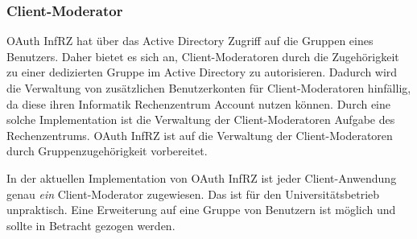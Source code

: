 \documentclass[12pt,a4paper,pointednumbers,abstracton]{scrartcl}
\begin{document}
\subsubsection{Client-Moderator}
\label{sec:oauth-infrz/moderator}

OAuth InfRZ hat über das Active Directory Zugriff auf die Gruppen eines Benutzers.
Daher bietet es sich an, Client-Moderatoren durch die Zugehörigkeit zu einer dedizierten Gruppe im Active Directory zu autorisieren.
Dadurch wird die Verwaltung von zusätzlichen Benutzerkonten für Client-Moderatoren hinfällig, da diese ihren Informatik Rechenzentrum Account nutzen können.
Durch eine solche Implementation ist die Verwaltung der Client-Moderatoren Aufgabe des Rechenzentrums.
OAuth InfRZ ist auf die Verwaltung der Client-Moderatoren durch Gruppenzugehörigkeit vorbereitet.

In der aktuellen Implementation von OAuth InfRZ ist jeder Client-Anwendung genau \emph{ein} Client-Moderator zugewiesen.
Das ist für den Universitätsbetrieb unpraktisch.
Eine Erweiterung auf eine Gruppe von Benutzern ist möglich und sollte in Betracht gezogen werden.
\end{document}
